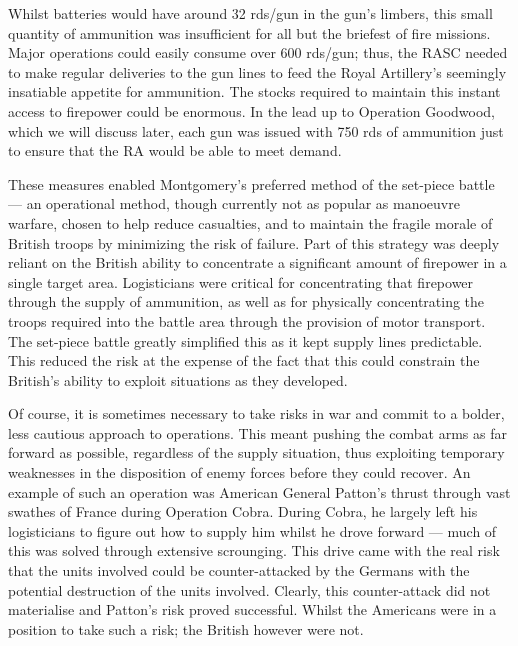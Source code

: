 \documentclass[noraggedright]{turabian-researchpaper}
\begin{document}
Whilst batteries would have around 32 rds/gun in the gun's limbers, this small 
quantity of ammunition was insufficient for all but the briefest of fire 
missions.\autocite[51]{gunfire} Major operations could easily consume over 600 
rds/gun; thus, the RASC needed to make regular deliveries to the gun lines to 
feed the Royal Artillery's seemingly insatiable appetite for 
ammunition.\autocite [122-3, 125]{gunfire} The stocks required to maintain 
this instant access to firepower could be enormous.  In the lead up to 
Operation Goodwood, which we will discuss later, each gun was issued with 750 
rds of ammunition just to ensure that the RA would be able to meet 
demand. %

These measures enabled Montgomery's preferred method of the
set-piece battle --- an operational method, though currently not as popular as
manoeuvre warfare, chosen to help reduce casualties, and to maintain the 
fragile morale of British troops by minimizing the risk of failure.\autocite
[100-1]{cracks}  Part of this strategy was deeply reliant on the British 
ability to concentrate a significant amount of firepower in a
single target area.  Logisticians were critical for concentrating that
firepower through the supply of ammunition, as well as for physically 
concentrating the troops required into the battle area through the provision
of motor transport.  The set-piece battle greatly simplified this as it kept
supply lines predictable.  This reduced the risk at the expense of the fact 
that this could constrain the British's ability to exploit situations as they
developed.



Of course, it is sometimes necessary to take risks in war and commit to a
bolder, less cautious approach to operations.  This meant pushing the combat
arms as far forward as possible, regardless of the supply situation, thus 
exploiting temporary weaknesses in the disposition of
enemy forces before they could recover.  An example of such an operation was 
American General Patton's thrust through vast swathes of France during 
Operation Cobra.\autocite[100]{cracks} During Cobra, he largely left his 
logisticians to figure out how to supply him whilst he drove forward --- much 
of this was solved through extensive scrounging.  %
This drive came with the real risk that the units involved could be
counter-attacked by the Germans with the potential destruction of the units
involved.  Clearly, this counter-attack did not materialise and Patton's risk
proved successful.\autocite[100-1]{cracks}  Whilst the Americans were in a 
position to take such a risk; the British however were not.
\end{document}
